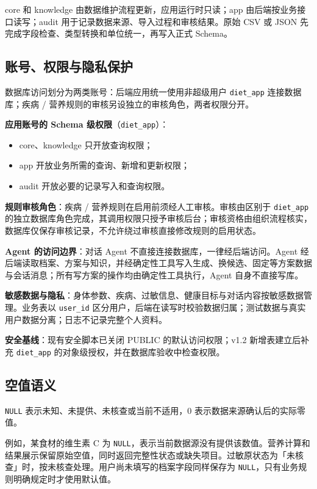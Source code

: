\documentclass[12pt,a4paper]{ctexart}
\begin{document}
core 和 knowledge 由数据维护流程更新，应用运行时只读；app 由后端按业务接口读写；audit 用于记录数据来源、导入过程和审核结果。原始 CSV 或 JSON 先完成字段检查、类型转换和单位统一，再写入正式 Schema。

\subsection{账号、权限与隐私保护}

数据库访问划分为两类账号：后端应用统一使用非超级用户 \texttt{diet\_app} 连接数据库；疾病 / 营养规则的审核另设独立的审核角色，两者权限分开。

\textbf{应用账号的 Schema 级权限}（\texttt{diet\_app}）：
\begin{itemize}
\item core、knowledge 只开放查询权限；
\item app 开放业务所需的查询、新增和更新权限；
\item audit 开放必要的记录写入和查询权限。
\end{itemize}

\textbf{规则审核角色}：疾病 / 营养规则在启用前须经人工审核。审核由区别于 \texttt{diet\_app} 的独立数据库角色完成，其调用权限只授予审核后台；审核资格由组织流程核实，数据库仅保存审核记录，不允许绕过审核直接修改规则的启用状态。

\textbf{Agent 的访问边界}：对话 Agent 不直接连接数据库，一律经后端访问。Agent 经后端读取档案、方案与知识，并经确定性工具写入生成、换候选、固定等方案数据与会话消息；所有写方案的操作均由确定性工具执行，Agent 自身不直接写库。

\textbf{敏感数据与隐私}：身体参数、疾病、过敏信息、健康目标与对话内容按敏感数据管理。业务表以 \texttt{user\_id} 区分用户，后端在读写时校验数据归属；测试数据与真实用户数据分离；日志不记录完整个人资料。

\textbf{安全基线}：现有安全脚本已关闭 PUBLIC 的默认访问权限；v1.2 新增表建立后补充 \texttt{diet\_app} 的对象级授权，并在数据库验收中检查权限。

\subsection{空值语义}

\texttt{NULL} 表示未知、未提供、未核查或当前不适用，0 表示数据来源确认后的实际零值。

例如，某食材的维生素 C 为 \texttt{NULL}，表示当前数据源没有提供该数值。营养计算和结果展示保留原始空值，同时返回完整性状态或缺失项目。过敏原状态为「未核查」时，按未核查处理。用户尚未填写的档案字段同样保存为 \texttt{NULL}，只有业务规则明确规定时才使用默认值。
\end{document}
